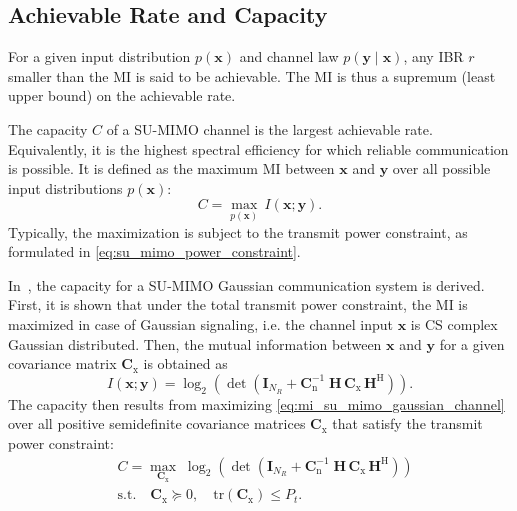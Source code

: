 \subsection{Achievable Rate and Capacity}
\label{subsection:achievable_rate_and_capacity}

For a given input distribution $p(\mathbf{x})$ and channel law $p(\mathbf{y}\mid\mathbf{x})$, any \ac{IBR} $r$ smaller than the \ac{MI} is said to be achievable. The \ac{MI} is thus a supremum (least upper bound) on the achievable rate.

The capacity $C$ of a \ac{SU}-\ac{MIMO} channel is the largest achievable rate. Equivalently, it is the highest spectral efficiency for which reliable communication is possible. It is defined as the maximum \ac{MI} between $\mathbf{x}$ and $\mathbf{y}$ over all possible input distributions $p(\mathbf{x})$:
\begin{equation}
\label{eq:capacity}
    C = \max_{p(\mathbf{x})} \, I(\mathbf{x};\mathbf{y}).
\end{equation}
Typically, the maximization is subject to the transmit power constraint, as formulated in \eqref{eq:su_mimo_power_constraint}.

In~\cite{telatar_1999}, the capacity for a \ac{SU}-\ac{MIMO} Gaussian communication system is derived. First, it is shown that under the total transmit power constraint, the \ac{MI} is maximized in case of Gaussian signaling, i.e. the channel input $\mathbf{x}$ is \ac{CS} complex Gaussian distributed. Then, the mutual information between $\mathbf{x}$ and $\mathbf{y}$ for a given covariance matrix $\mathbf{C}_{\mathrm{x}}$ is obtained as
\begin{equation}
\label{eq:mi_su_mimo_gaussian_channel}
    I(\mathbf{x};\mathbf{y})
    = \log_2\left(\det\left(\mathbf{I}_{N_R} +  \mathbf{C}_{\mathrm{n}}^{-1} \; \mathbf{H}\,\mathbf{C}_{\mathrm{x}}\,\mathbf{H}^\mathrm{H} \right)\right).
\end{equation}
The capacity then results from maximizing \eqref{eq:mi_su_mimo_gaussian_channel} over all positive semidefinite covariance matrices $\mathbf{C}_{\mathrm{x}}$ that satisfy the transmit power constraint:
\begin{equation}
\label{eq:capacity_su_mimo_gaussian_channel_optimization_problem}
\begin{aligned}
    & C = \max_{\mathbf{C}_{\mathrm{x}}} \; \log_2\left(\det\left(\mathbf{I}_{N_R} + \mathbf{C}_{\mathrm{n}}^{-1} \; \mathbf{H}\,\mathbf{C}_{\mathrm{x}}\,\mathbf{H}^\mathrm{H} \right)\right) \\
    & \text{s.t.} \quad \mathbf{C}_{\mathrm{x}} \succeq 0, \quad \mathrm{tr}\!\left(\mathbf{C}_{\mathrm{x}}\right) \leq P_t.
\end{aligned}
\end{equation}


